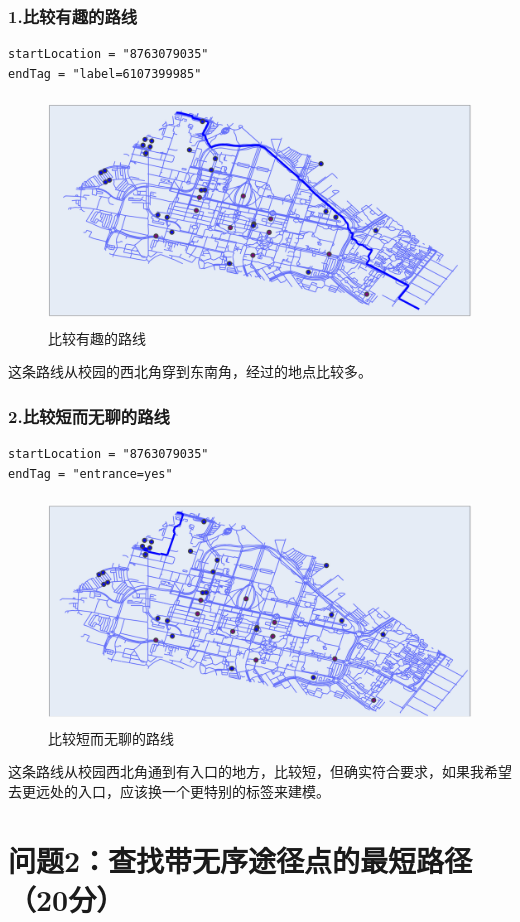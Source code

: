 \documentclass{article}
\begin{document}
\subsubsection*{1.比较有趣的路线}
\begin{lstlisting}
startLocation = "8763079035"
endTag = "label=6107399985"
\end{lstlisting}
\begin{figure}[H]
	\centering 
	\includegraphics[height=6cm,width=14cm]{1.png}
    \caption{比较有趣的路线}
\end{figure}
这条路线从校园的西北角穿到东南角，经过的地点比较多。
\subsubsection*{2.比较短而无聊的路线}
    \begin{lstlisting}
startLocation = "8763079035"
endTag = "entrance=yes"
    \end{lstlisting}
	
	\begin{figure}[H]
		\centering 
		\includegraphics[height=6cm,width=14cm]{3.png}
        \caption{比较短而无聊的路线}
    \end{figure}
这条路线从校园西北角通到有入口的地方，比较短，但确实符合要求，如果我希望去更远处的入口，应该换一个更特别的标签来建模。

\section*{问题2：查找带无序途径点的最短路径（20分）}
\end{document}
